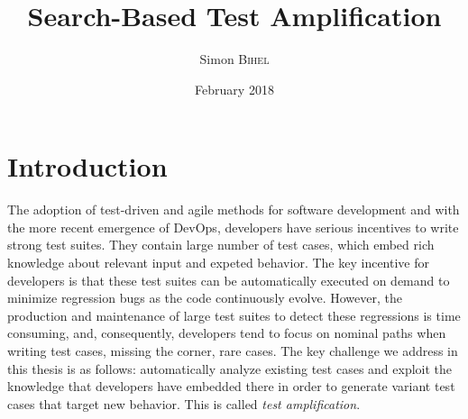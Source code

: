 \documentclass[11pt]{sdm}
\title{Search-Based Test Amplification}
\author{Simon \textsc{Bihel}}
\date{February 2018}
\newcommand{\dspot}{DSpot\xspace}
\begin{document}
\maketitle

\section*{Introduction}
\label{intro}

The adoption of test-driven and agile methods for software development and with the more recent emergence of DevOps, developers have serious incentives to write strong test suites. They contain large number of test cases, which embed rich knowledge about relevant input and expeted behavior. The key incentive for developers is that these test suites can  be automatically executed on demand to minimize regression bugs as the code continuously evolve. However, the production and maintenance of large test suites to detect these regressions is time consuming, and, consequently, developers tend to focus on nominal paths when writing test cases, missing the corner, rare cases. The key challenge we address in this thesis is as follows: automatically analyze existing test cases and exploit the knowledge that developers have embedded there in order to generate variant test cases that target new behavior. This is called \emph{test amplification}.
\end{document}
